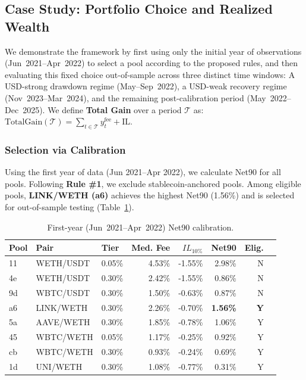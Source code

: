 \documentclass[journal]{IEEEtran}
\begin{document}
\subsection{Case Study: Portfolio Choice and Realized Wealth}
\label{sec:case_study}
We demonstrate the framework by first using only the initial year of observations (Jun~2021--Apr~2022) to select a pool according to the proposed rules, and then evaluating this fixed choice out-of-sample across three distinct time windows: A USD-strong drawdown regime (May--Sep~2022), a USD-weak recovery regime (Nov~2023--Mar~2024), and the remaining post-calibration period (May~2022--Dec~2025). We define \textbf{Total Gain} over a period $\mathcal{T}$ as:
\(
\mathrm{TotalGain}(\mathcal{T}) = \sum_{t\in\mathcal{T}} y^{\text{fee}}_t + \mathrm{IL}.
\)

\subsubsection{Selection via Calibration}

Using the first year of data (Jun 2021--Apr 2022), we calculate Net90 for all pools. Following \textbf{Rule \#1}, we exclude stablecoin-anchored pools. Among eligible pools, \textbf{LINK/WETH (a6)} achieves the highest Net90 (1.56\%) and is selected for out-of-sample testing (Table~\ref{tab:first_year_net90}).
\begin{table}[h]
\centering
\scriptsize
\begin{tabular}{lllrrrrc}
\toprule
Pool & Pair & Tier & Med. Fee & $IL_{10\%}$ & \textbf{Net90} & Elig. \\
\midrule
11 & WETH/USDT & 0.05\% & 4.53\% & -1.55\% & 2.98\% & N \\
4e & WETH/USDT & 0.30\% & 2.42\% & -1.55\% & 0.86\% & N \\
9d & WBTC/USDT & 0.30\% & 1.50\% & -0.63\% & 0.87\% & N \\
\rowcolor{gray!15}
a6 & LINK/WETH & 0.30\% & 2.26\% & -0.70\% & \textbf{1.56\%} & \textbf{Y} \\
5a & AAVE/WETH & 0.30\% & 1.85\% & -0.78\% & 1.06\% & Y \\
45 & WBTC/WETH & 0.05\% & 1.17\% & -0.25\% & 0.92\% & Y \\
cb & WBTC/WETH & 0.30\% & 0.93\% & -0.24\% & 0.69\% & Y \\
1d & UNI/WETH & 0.30\% & 1.08\% & -0.77\% & 0.31\% & Y \\
\bottomrule
\end{tabular}
\caption{First-year (Jun~2021--Apr~2022) Net90 calibration. }
\label{tab:first_year_net90}
\end{table}
\end{document}
